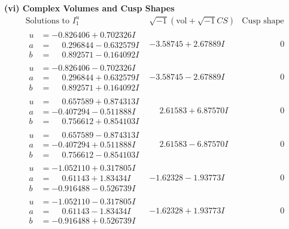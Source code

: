\documentclass[1p]{elsarticle_modified}
\theoremstyle{definition}
\newcommand{\I}{\sqrt{-1}}
\begin{document}
\newpage\flushleft \textbf{(vi) Complex Volumes and Cusp Shapes}
$$\begin{array}{c|c|c}  
\text{Solutions to }I^u_{1}& \I (\text{vol} + \sqrt{-1}CS) & \text{Cusp shape}\\
 \hline 
\begin{aligned}
u &= -0.826406 + 0.702326 I \\
a &= \phantom{-}0.296844 - 0.632579 I \\
b &= \phantom{-}0.892571 - 0.164092 I\end{aligned}
 & -3.58745 + 2.67889 I & \phantom{-0.000000 } 0 \\ \hline\begin{aligned}
u &= -0.826406 - 0.702326 I \\
a &= \phantom{-}0.296844 + 0.632579 I \\
b &= \phantom{-}0.892571 + 0.164092 I\end{aligned}
 & -3.58745 - 2.67889 I & \phantom{-0.000000 } 0 \\ \hline\begin{aligned}
u &= \phantom{-}0.657589 + 0.874313 I \\
a &= -0.407294 - 0.511888 I \\
b &= \phantom{-}0.756612 + 0.854103 I\end{aligned}
 & \phantom{-}2.61583 + 6.87570 I & \phantom{-0.000000 } 0 \\ \hline\begin{aligned}
u &= \phantom{-}0.657589 - 0.874313 I \\
a &= -0.407294 + 0.511888 I \\
b &= \phantom{-}0.756612 - 0.854103 I\end{aligned}
 & \phantom{-}2.61583 - 6.87570 I & \phantom{-0.000000 } 0 \\ \hline\begin{aligned}
u &= -1.052110 + 0.317805 I \\
a &= \phantom{-}0.61143 + 1.83434 I \\
b &= -0.916488 - 0.526739 I\end{aligned}
 & -1.62328 - 1.93773 I & \phantom{-0.000000 } 0 \\ \hline\begin{aligned}
u &= -1.052110 - 0.317805 I \\
a &= \phantom{-}0.61143 - 1.83434 I \\
b &= -0.916488 + 0.526739 I\end{aligned}
 & -1.62328 + 1.93773 I & \phantom{-0.000000 } 0 \\ \hline\begin{aligned}

\end{aligned}
\end{array}$$
\end{document}
